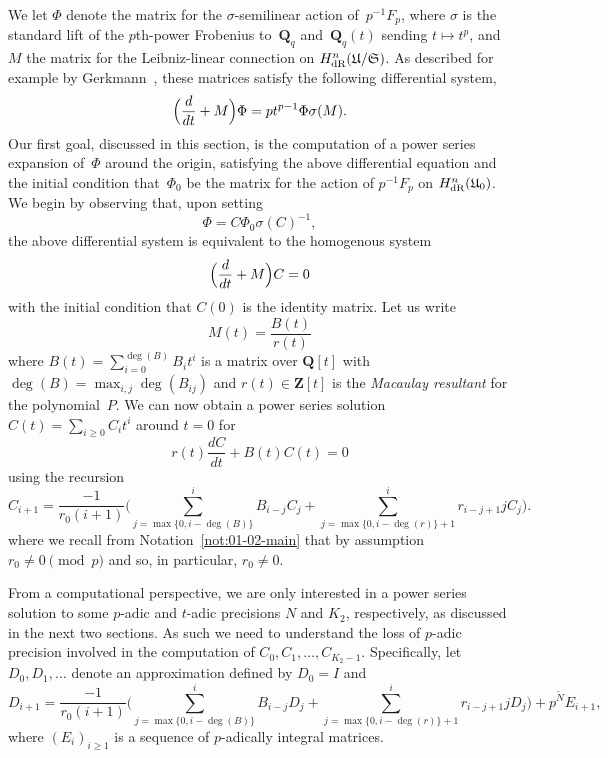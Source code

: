 We let $\Phi$ denote the matrix for the $\sigma$-semilinear action 
of~$p^{-1} F_p$, where $\sigma$ is the standard lift of the $p$th-power 
Frobenius to~$\mathbf{Q}_q$ and~$\mathbf{Q}_q(t)$ sending $t \mapsto t^p$, 
and $M$ the matrix for the Leibniz-linear connection on 
$H_{\text{dR}}^n(\mathfrak{U}/\mathfrak{S})$.
As described for example by Gerkmann~\citep[\S 5]{Gerkmann2007}, these 
matrices satisfy the following differential system,
\begin{equation*}
\Bigl(\frac{d}{dt} + M\Bigr) \Phi = p t^{p-1} \Phi \sigma(M).
\end{equation*}
Our first goal, discussed in this section, is the computation of 
a power series expansion of~$\Phi$ around the origin, satisfying 
the above differential equation and the initial condition that~$\Phi_0$ 
be the matrix for the action of $p^{-1} F_p$ on $H_{\text{dR}}^n(\mathfrak{U}_0)$.
We begin by observing that, upon setting 
\begin{equation*}
\Phi = C \Phi_0 \sigma(C)^{-1},
\end{equation*}
the above differential system is equivalent to the homogenous system 
\begin{equation} \label{eq:01-GMDE-Homogenous}
\Bigl(\frac{d}{dt} + M\Bigr) C = 0
\end{equation}
with the initial condition that $C(0)$ is the identity matrix.  Let us write 
\begin{equation*}
M(t) = \frac{B(t)}{r(t)}
\end{equation*}
where $B(t) = \sum_{i=0}^{\deg(B)} B_i t^i$ is a matrix over $\mathbf{Q}[t]$ 
with $\deg(B) = \max_{i,j} \deg(B_{ij})$ and $r(t) \in \mathbf{Z}[t]$ is the 
\emph{Macaulay resultant} for the polynomial~$P$.  We can now obtain a 
power series solution $C(t) = \sum_{i \geq 0} C_i t^i$ around $t=0$ for 
\begin{equation*}
r(t) \frac{dC}{dt} + B(t) C(t) = 0
\end{equation*}
using the recursion 
\begin{equation*}
C_{i+1} = \frac{-1}{r_0 (i+1)} \biggl(
    \sum_{j=\max{\{0,i-\deg(B)\}}}^i B_{i-j} C_j + 
    \sum_{j=\max{\{0,i-\deg(r)\}}+1}^i r_{i-j+1} j C_j \biggr).
\end{equation*}
where we recall from Notation~\ref{not:01-02-main} that by 
assumption $r_0 \neq 0 \pmod{p}$ and so, in particular, $r_0 \neq 0$.

From a computational perspective, we are only interested in a power 
series solution to some $p$-adic and $t$-adic precisions $N$ and $K_2$, 
respectively, as discussed in the next two sections.  As such we need 
to understand the loss of $p$-adic precision involved in the computation 
of $C_0, C_1, \dotsc, C_{K_2-1}$.  Specifically, let $D_0, D_1, \dotsc$ 
denote an approximation defined by $D_0 = I$ and 
\begin{equation*}
D_{i+1} = \frac{-1}{r_0 (i+1)} \biggl(
    \sum_{j=\max{\{0,i-\deg(B)\}}}^i B_{i-j} D_j + 
    \sum_{j=\max{\{0,i-\deg(r)\}}+1}^i r_{i-j+1} j D_j \biggr) + 
    p^{\tilde{N}} E_{i+1},
\end{equation*}
where $(E_i)_{i \geq 1}$ is a sequence of $p$-adically integral matrices. 

